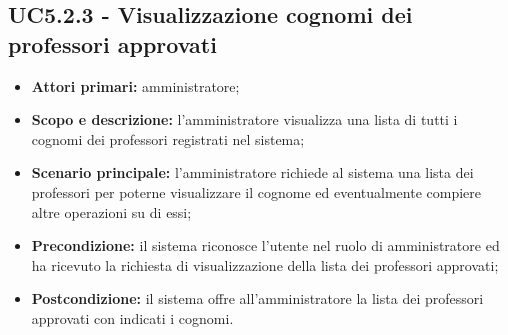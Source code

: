 \documentclass[AnalisiDeiRequisiti.tex]{subfiles}
\begin{document}
\subsection{UC5.2.3 - Visualizzazione cognomi dei professori approvati}
\begin{itemize}
	\item \textbf{Attori primari:} amministratore;
	\item \textbf{Scopo e descrizione:} l'amministratore visualizza una lista di tutti i cognomi dei professori registrati nel sistema;
	\item \textbf{Scenario principale:} l'amministratore richiede al sistema una lista dei professori per poterne visualizzare il cognome ed eventualmente compiere altre operazioni su di essi;
	\item \textbf{Precondizione:} il sistema riconosce l'utente nel ruolo di amministratore ed ha ricevuto la richiesta di visualizzazione della lista dei professori approvati;
	\item \textbf{Postcondizione:} il sistema offre all'amministratore la lista dei professori approvati con indicati i cognomi.
\end{itemize}
\end{document}
